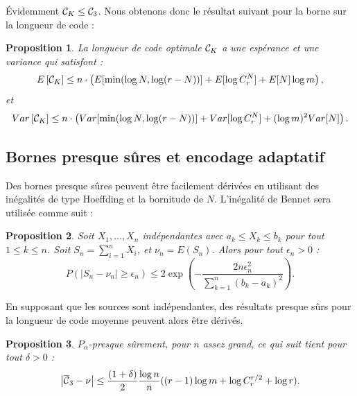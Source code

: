 \documentclass[11pt,a4paper]{article}
\newtheorem{prop}{Proposition}[section]
\def \CR {{\cal C}}
\begin{document}
	Évidemment $\CR_K \leq \CR_3$. Nous obtenons donc le résultat suivant pour la borne sur la longueur de code :
	
	\begin{prop}
		\label{prop:bornes_optimcodeplus}
		La longueur de code optimale $\CR_K$ a une espérance et une variance qui satisfont :
		\begin{equation}
			E \left [ \CR_K \right ] \leq n \cdot \left( E[\min(\log N, \log(r-N))] + E[\log C_r^N] + E[N]\log m \right),
		\end{equation}
		et
		\begin{equation}
			Var \left [ \CR_K \right ] \leq n \cdot \left( Var[\min(\log N, \log(r-N))] + Var[\log C_r^N] + (\log m)^2 Var[N] \right).
		\end{equation}
	\end{prop}
	
	\subsection{Bornes presque sûres et encodage adaptatif}
	\label{subsec:bornes_presque_sures}
	
	Des bornes presque sûres peuvent être facilement dérivées en utilisant des inégalités de type Hoeffding et la bornitude de $N$. L'inégalité de Bennet sera utilisée comme suit :
	
	\begin{prop}
		\label{prop:bennet}
		Soit $X_1,\dots,X_n$ indépendantes avec $a_k \leq X_k \leq b_k$ pour tout $1 \leq k \leq n$. Soit $S_n=\sum_{i=1}^n X_i$, et $\nu_n=E(S_n)$. Alors pour tout $\epsilon_n > 0$ :
		$$P\left ( \vert S_n - \nu_n \vert \geq \epsilon_n \right ) \leq 2\exp\left(-\frac{2n\epsilon_n^2}{\sum_{k=1}^n(b_k-a_k)^2}\right).$$
	\end{prop}
	
	En supposant que les sources sont indépendantes, des résultats presque sûrs pour la longueur de code moyenne peuvent alors être dérivés.
	
	\begin{prop}
		\label{prop:bornes_presque_sures}
		$P_{\alpha}$-presque sûrement, pour $n$ assez grand, ce qui suit tient pour tout $\delta > 0$ :
		\begin{equation}
			\left \vert \overline{\CR}_3  - \nu \right \vert \leq \frac{(1+\delta)}{2}\frac{\log n}{n}((r-1)\log m + \log C_r^{r/2} + \log r).
		\end{equation}
	\end{prop}
	
\end{document}
